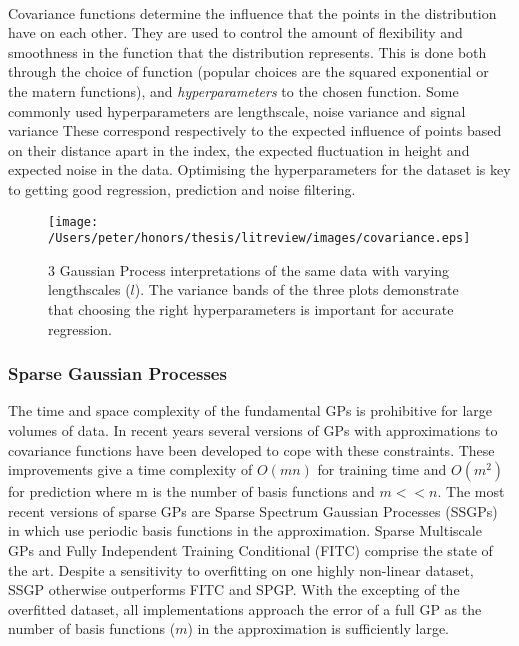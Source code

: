 	\paragraph{}
	Covariance functions determine the influence that the points in the distribution have on each other. They are used to control the amount of flexibility and smoothness in the function that the distribution represents. This is done both through the choice of function (popular choices are the squared exponential or the matern functions), and \emph{hyperparameters} to the chosen function. Some commonly used hyperparameters are lengthscale, noise variance and signal variance These correspond respectively to the expected influence of points based on their distance apart in the index, the expected fluctuation in height and expected noise in the data. Optimising the hyperparameters for the dataset is key to getting good regression, prediction and noise filtering.

	\begin{figure}[ht!]
	\centering
	\texttt{[image: /Users/peter/honors/thesis/litreview/images/covariance.eps]}
	\caption{3 Gaussian Process interpretations of the same data with varying lengthscales ($l$). The variance bands of the three plots demonstrate that choosing the right hyperparameters is important for accurate regression.}
	\label{gaussianprocesshyperparameters}
	\end{figure}
	

	
	\subsubsection{Sparse Gaussian Processes}
	The time and space complexity of the fundamental GPs is prohibitive for large volumes of data. In recent years several versions of GPs with approximations to covariance functions have been developed to cope with these constraints. These improvements give a time complexity of $O(mn)$ for training time and $O(m^{2})$ for prediction where m is the number of basis functions and $m << n$. The most recent versions of sparse GPs are Sparse Spectrum Gaussian Processes (SSGPs) in \citep{rasmussen2010ssgpr} which use periodic basis functions in the approximation. Sparse Multiscale GPs \citep{walder2008sparse} and Fully Independent Training Conditional (FITC) \citep{snelson2005sgppi} comprise the state of the art. Despite a sensitivity to overfitting on one highly non-linear dataset, SSGP otherwise outperforms FITC and SPGP. With the excepting of the overfitted dataset, all implementations approach the error of a full GP as the number of basis functions ($m$) in the approximation is sufficiently large.

